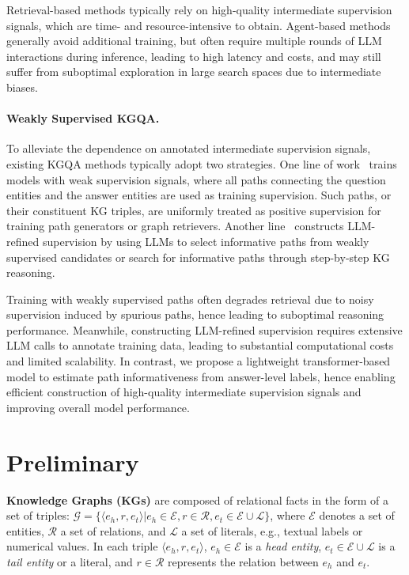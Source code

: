 \documentclass{article}
\begin{document}
Retrieval-based methods typically rely on high-quality intermediate supervision signals, which are time- and resource-intensive to obtain. Agent-based methods generally avoid additional training, but often require multiple rounds of LLM interactions during inference, leading to high latency and costs, and may still suffer from suboptimal exploration in large search spaces due to intermediate biases.

\paragraph{Weakly Supervised KGQA.} To alleviate the dependence on annotated intermediate supervision signals, existing KGQA methods typically adopt two strategies. One line of work~\citep{li_subgraphrag_2025, ma_dp_2025, luo_gcr_2025, luo_rog_2024} trains models with weak supervision signals, where all paths connecting the question entities and the answer entities are used as training supervision. Such paths, or their constituent KG triples, are uniformly treated as positive supervision for training path generators or graph retrievers.
Another line~\citep{luo_kbqao1_2025, wang_damr_2025, yao_rapl_2025} constructs LLM-refined supervision by using LLMs to select informative paths from weakly supervised candidates or search for informative paths through step-by-step KG reasoning. 

Training with weakly supervised paths often degrades retrieval due to noisy supervision induced by spurious paths, hence leading to suboptimal reasoning performance.
Meanwhile, constructing LLM-refined supervision requires extensive LLM calls to annotate training data, leading to substantial computational costs and limited scalability. In contrast, we propose a lightweight transformer-based model to estimate path informativeness from answer-level labels, hence enabling efficient construction of high-quality intermediate supervision signals and improving overall model performance.

\vspace{-1mm}
\section{Preliminary}\label{sec:preliminary}
\vspace{-1mm}

\textbf{Knowledge Graphs (KGs)} are composed of  relational facts in the form of a set of triples: $\mathcal{G} = \{ \langle e_h, r, e_t \rangle |e_h \in \mathcal{E}, r \in \mathcal{R}, e_t \in \mathcal{E} \cup \mathcal{L}\}$, where $\mathcal{E}$ denotes a set of entities, $\mathcal{R}$ a set of relations, and $\mathcal{L}$ a set of literals, e.g., textual labels or numerical values. In each triple $\langle e_h, r, e_t \rangle$, $e_h \in \mathcal{E}$ is a \textit{head entity}, $e_t \in \mathcal{E} \cup \mathcal{L}$ is a \textit{tail entity} or a literal, and $r \in \mathcal{R}$ represents the relation between $e_h$ and $e_t$.
\end{document}
